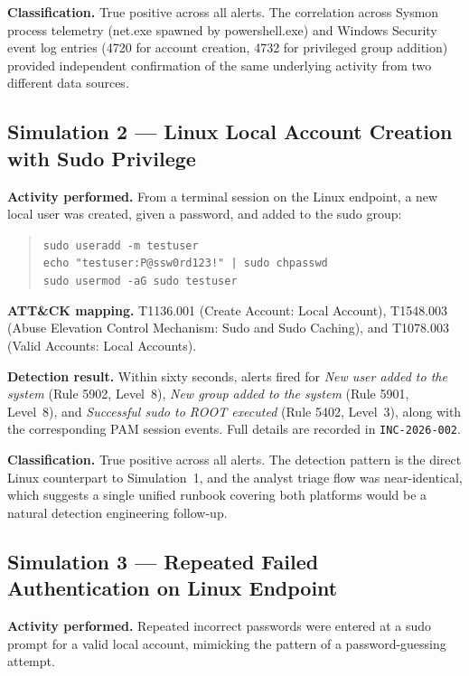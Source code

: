 \textbf{Classification.} True positive across all alerts. The correlation
across Sysmon process telemetry (net.exe spawned by powershell.exe) and
Windows Security event log entries (4720 for account creation, 4732 for
privileged group addition) provided independent confirmation of the same
underlying activity from two different data sources.

\subsection{Simulation 2 --- Linux Local Account Creation with Sudo Privilege}
\label{sec:sim2}

\textbf{Activity performed.} From a terminal session on the Linux endpoint,
a new local user was created, given a password, and added to the sudo group:

\begin{quote}\small
\texttt{sudo useradd -m testuser}\\
\texttt{echo "testuser:P@ssw0rd123!" | sudo chpasswd}\\
\texttt{sudo usermod -aG sudo testuser}
\end{quote}

\textbf{ATT\&CK mapping.} T1136.001 (Create Account: Local Account),
T1548.003 (Abuse Elevation Control Mechanism: Sudo and Sudo Caching), and
T1078.003 (Valid Accounts: Local Accounts).

\textbf{Detection result.} Within sixty seconds, alerts fired for
\textit{New user added to the system} (Rule 5902, Level~8), \textit{New
group added to the system} (Rule 5901, Level~8), and \textit{Successful
sudo to ROOT executed} (Rule 5402, Level~3), along with the corresponding
PAM session events. Full details are recorded in \texttt{INC-2026-002}.

\textbf{Classification.} True positive across all alerts. The detection
pattern is the direct Linux counterpart to Simulation~1, and the analyst
triage flow was near-identical, which suggests a single unified runbook
covering both platforms would be a natural detection engineering follow-up.

\subsection{Simulation 3 --- Repeated Failed Authentication on Linux Endpoint}
\label{sec:sim3}

\textbf{Activity performed.} Repeated incorrect passwords were entered at a
sudo prompt for a valid local account, mimicking the pattern of a
password-guessing attempt.

